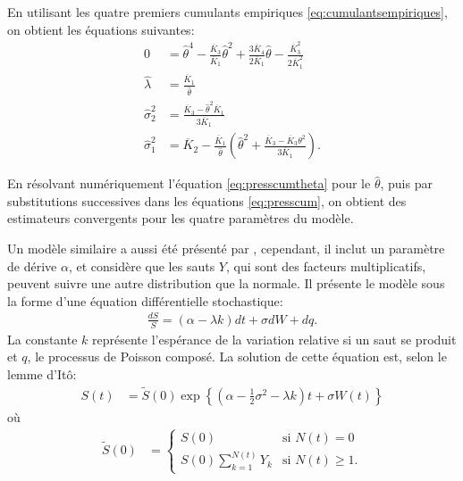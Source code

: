 En utilisant les quatre premiers cumulants empiriques
\eqref{eq:cumulantsempiriques}, on obtient les équations suivantes:
\begin{subequations}\label{eq:presscum}
  \begin{align}
    0 &= \hat\theta^4 - \frac{\overline{K}_3}{\overline{K}_1} \hat\theta^2 + \frac{3\overline{K}_4}{2\overline{K}_1} \hat\theta - \frac{\overline{K}_3^2}{2\overline{K}_1^2} \label{eq:presscumtheta}\\
    \hat\lambda &= \frac{\overline{K}_1}{\hat\theta} \label{eq:presscumlambda}\\
    \hat\sigma_2^2 &= \frac{\overline{K}_3-\hat\theta^2\overline{K}_1}{3\overline{K}_1} \label{eq:presscumsigma2}\\
    \hat\sigma_1^2 &= \overline{K}_2 -
    \frac{\overline{K}_1}{\hat\theta}\left(\hat\theta^2 +
      \frac{\overline{K}_3 - \overline{K}_3 \theta^2}{3\overline{K}_1}
    \right). \label{eq:presscumsigma1}
  \end{align}
\end{subequations}

En résolvant numériquement l'équation \eqref{eq:presscumtheta} pour le
$\hat\theta$, puis par substitutions successives dans les équations
\eqref{eq:presscum}, on obtient des estimateurs convergents pour les
quatre paramètres du modèle.

Un modèle similaire a aussi été présenté par \cite{merton1976option},
cependant, il inclut un paramètre de dérive $\alpha$, et considère que
les sauts $Y$, qui sont des facteurs multiplicatifs, peuvent suivre une autre distribution que la normale. Il
présente le modèle sous la forme d'une équation différentielle
stochastique:
\begin{align}
  \label{eq:modelemerton}
  \frac{dS}{S} = (\alpha - \lambda k)dt + \sigma dW + dq.
\end{align}
La constante $k$ représente l'espérance de la variation relative si un
saut se produit et $q$, le processus de Poisson composé. La solution
de cette équation est, selon le lemme d'Itô:
\begin{align}
  S(t) &= \tilde{S}(0) \exp \left\{
    (\alpha-\frac{1}{2}\sigma^2-\lambda k)t +
    \sigma W(t) \right\}
    \end{align}
    où
    \begin{align}
  \tilde{S}(0) &= \begin{cases}
    S(0) & \text{si } N(t) = 0\\
    S(0) \sum_{k=1}^{N(t)} Y_k & \text{si } N(t) \geq 1. \nonumber
  \end{cases}
\end{align}

